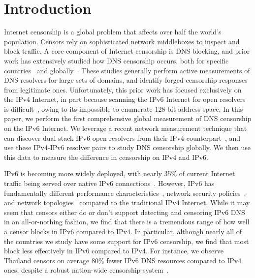 \section{Introduction}\label{sec:intro}

Internet censorship is a global problem that affects over half the world's
population. Censors rely on sophisticated network middleboxes to inspect and
block traffic. A core component of Internet censorship is DNS blocking, and
prior work has extensively studied how DNS censorship occurs, both for specific
countries~\cite{Anonymous2020:TripletCensors,USESEC21:GFWatch} and
globally~\cite{kuhrer2015going,dagon2008corrupted,pearce2017global,scott2016satellite}.
%
These studies generally perform active measurements of DNS resolvers for large
sets of domains, and identify forged censorship responses from legitimate ones.
%
Unfortunately, this prior work has focused exclusively on the IPv4 Internet, in
part because scanning the IPv6 Internet for open resolvers is
difficult~\cite{murdock2017target}, owing to its impossible-to-enumerate 128-bit
address space.
%
In this paper, we perform the first comprehensive global measurement of DNS
censorship on the IPv6 Internet. We leverage a recent network measurement
technique that can discover dual-stack IPv6 open resolvers from their IPv4
counterpart~\cite{hendriks2017potential}, and use these IPv4-IPv6 resolver pairs
to study DNS censorship globally. %
We then use this data to measure the difference in censorship on IPv4 and IPv6.

%
IPv6 is becoming more widely deployed, with nearly 35\% of current Internet
traffic being served over native IPv6 connections~\cite{Google-IPv6}. However,
IPv6 has fundamentally different performance
characteristics~\cite{Dhamdhere-IMC2012}, network security
policies~\cite{Czyz-NDSS2016}, and network topologies~\cite{Czyz-SIGCOMM2014}
compared to the traditional IPv4 Internet.
%
While it may seem that censors either do or don't support detecting and
censoring IPv6 DNS in an all-or-nothing fashion, we find that there is a
tremendous range of how well a censor blocks in IPv6 compared to IPv4.
%
In particular, although nearly all of the countries we study have some support
for IPv6 censorship, we find that most block less effectively in IPv6 compared
to IPv4. For instance, we observe Thailand censors on average 80\% fewer IPv6
DNS resources compared to IPv4 ones, despite a robust nation-wide censorship
system~\cite{gebhart2017internet}.

